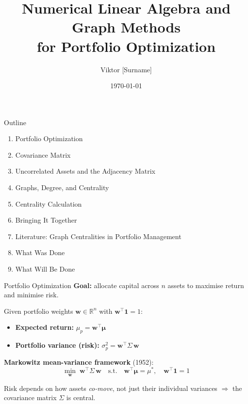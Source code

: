 \documentclass[aspectratio=169]{beamer}
\title[Graph Methods for Portfolio Optimization]{%
    Numerical Linear Algebra and Graph Methods\\[0.3em]for Portfolio Optimization}
\author{Viktor [Surname]}
\institute[KU Leuven]{%
    KU Leuven\\[0.4em]
    \small Supervisors: Prof.\ Vannieuwenhoven \& Prof.\ Noferini}
\date{\today}
\begin{document}
\begin{frame}
    \titlepage
\end{frame}

\begin{frame}{Outline}
    \begin{enumerate}
        \item Portfolio Optimization
        \item Covariance Matrix
        \item Uncorrelated Assets and the Adjacency Matrix
        \item Graphs, Degree, and Centrality
        \item Centrality Calculation
        \item Bringing It Together
        \item Literature: Graph Centralities in Portfolio Management
        \item What Was Done
        \item What Will Be Done
    \end{enumerate}
\end{frame}

\begin{frame}{Portfolio Optimization}
    \textbf{Goal:} allocate capital across $n$ assets to maximise return and minimise risk.

    \bigskip
    Given portfolio weights $\mathbf{w} \in \mathbb{R}^n$ with $\mathbf{w}^\top \mathbf{1} = 1$:
    \begin{itemize}
        \item \textbf{Expected return:} $\mu_p = \mathbf{w}^\top \boldsymbol{\mu}$
        \item \textbf{Portfolio variance (risk):} $\sigma_p^2 = \mathbf{w}^\top \Sigma\, \mathbf{w}$
    \end{itemize}

    \bigskip
    \textbf{Markowitz mean-variance framework} (1952):
    \[
        \min_{\mathbf{w}}\; \mathbf{w}^\top \Sigma\, \mathbf{w}
        \quad \text{s.t.} \quad
        \mathbf{w}^\top \boldsymbol{\mu} = \mu^*,\quad
        \mathbf{w}^\top \mathbf{1} = 1
    \]

    \bigskip
    Risk depends on how assets \emph{co-move}, not just their individual variances
    $\Rightarrow$ the covariance matrix $\Sigma$ is central.
\end{frame}
\end{document}
